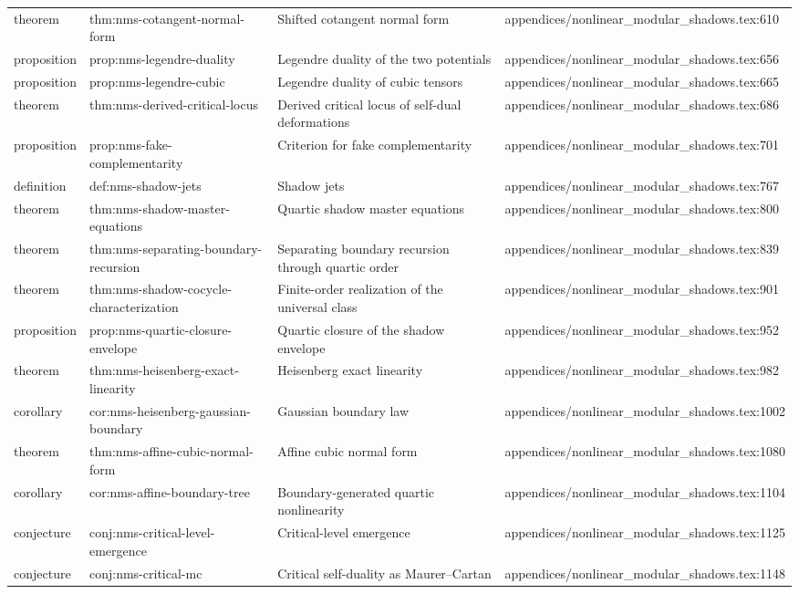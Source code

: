 \documentclass[11pt]{article}
\begin{document}
\begin{longtable}{L{0.10\textwidth}L{0.26\textwidth}L{0.42\textwidth}L{0.22\textwidth}}
theorem & thm:nms-cotangent-normal-form & Shifted cotangent normal form & appendices/nonlinear\_modular\_shadows.tex:610\\
proposition & prop:nms-legendre-duality & Legendre duality of the two potentials & appendices/nonlinear\_modular\_shadows.tex:656\\
proposition & prop:nms-legendre-cubic & Legendre duality of cubic tensors & appendices/nonlinear\_modular\_shadows.tex:665\\
theorem & thm:nms-derived-critical-locus & Derived critical locus of self-dual deformations & appendices/nonlinear\_modular\_shadows.tex:686\\
proposition & prop:nms-fake-complementarity & Criterion for fake complementarity & appendices/nonlinear\_modular\_shadows.tex:701\\
definition & def:nms-shadow-jets & Shadow jets & appendices/nonlinear\_modular\_shadows.tex:767\\
theorem & thm:nms-shadow-master-equations & Quartic shadow master equations & appendices/nonlinear\_modular\_shadows.tex:800\\
theorem & thm:nms-separating-boundary-recursion & Separating boundary recursion through quartic order & appendices/nonlinear\_modular\_shadows.tex:839\\
theorem & thm:nms-shadow-cocycle-characterization & Finite-order realization of the universal class & appendices/nonlinear\_modular\_shadows.tex:901\\
proposition & prop:nms-quartic-closure-envelope & Quartic closure of the shadow envelope & appendices/nonlinear\_modular\_shadows.tex:952\\
theorem & thm:nms-heisenberg-exact-linearity & Heisenberg exact linearity & appendices/nonlinear\_modular\_shadows.tex:982\\
corollary & cor:nms-heisenberg-gaussian-boundary & Gaussian boundary law & appendices/nonlinear\_modular\_shadows.tex:1002\\
theorem & thm:nms-affine-cubic-normal-form & Affine cubic normal form & appendices/nonlinear\_modular\_shadows.tex:1080\\
corollary & cor:nms-affine-boundary-tree & Boundary-generated quartic nonlinearity & appendices/nonlinear\_modular\_shadows.tex:1104\\
conjecture & conj:nms-critical-level-emergence & Critical-level emergence & appendices/nonlinear\_modular\_shadows.tex:1125\\
conjecture & conj:nms-critical-mc & Critical self-duality as Maurer--Cartan & appendices/nonlinear\_modular\_shadows.tex:1148\\

\end{longtable}
\end{document}
